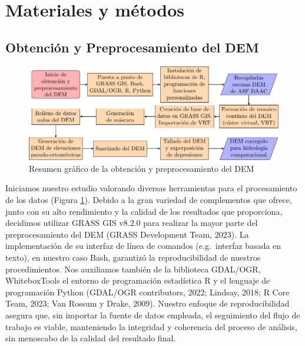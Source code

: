 \documentclass[spanish]{article}
\begin{document}
\hypertarget{materiales-y-muxe9todos}{%
\section{Materiales y métodos}\label{materiales-y-muxe9todos}}

\hypertarget{obtenciuxf3n-y-preprocesamiento-del-dem}{%
\subsection{Obtención y Preprocesamiento del
DEM}\label{obtenciuxf3n-y-preprocesamiento-del-dem}}

\begin{figure}[H]

{\centering \includegraphics[width=1\linewidth]{figuras/resumen-obtencion-preprocesamiento-dem} 

}

\caption{Resumen gráfico de la obtención y preprocesamiento del DEM}\label{fig:obtencionpreprocdem}
\end{figure}

Iniciamos nuestro estudio valorando diversas herramientas para el
procesamiento de los datos (Figura \ref{fig:obtencionpreprocdem}).
Debido a la gran variedad de complementos que ofrece, junto con su alto
rendimiento y la calidad de los resultados que proporciona, decidimos
utilizar GRASS GIS v8.2.0 para realizar la mayor parte del
preprocesamiento del DEM (GRASS Development Team, 2023). La
implementación de su interfaz de línea de comandos (e.g.~interfaz basada
en texto), en nuestro caso Bash, garantizó la reproducibilidad de
nuestros procedimientos. Nos auxiliamos también de la biblioteca
GDAL/OGR, WhiteboxTools el entorno de programación estadística R y el
lenguaje de programación Python (GDAL/OGR contributors, 2022; Lindsay,
2018; R Core Team, 2023; Van Rossum y Drake, 2009). Nuestro enfoque de
reproducibilidad asegura que, sin importar la fuente de datos empleada,
el seguimiento del flujo de trabajo es viable, manteniendo la integridad
y coherencia del proceso de análisis, sin menoscabo de la calidad del
resultado final.
\end{document}
